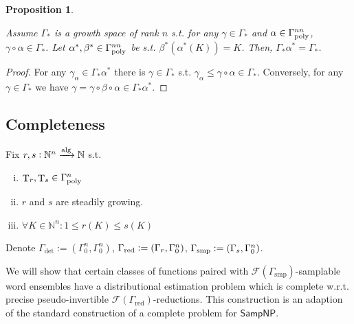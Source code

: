 \documentclass{article}
\numberwithin{equation}{section}
\theoremstyle{definition}
\theoremstyle{plain}
\newtheorem{proposition}{Proposition}[section]
\DeclareMathOperator{\T}{T}
\newcommand{\Nats}{\mathbb{N}}
\newcommand{\Fall}{\mathcal{F}}
\newcommand{\GammaPoly}{\Gamma_{\textnormal{poly}}}
\newcommand{\Alg}{\xrightarrow{\textnormal{alg}}}
\begin{document}
\begin{samepage}
\begin{proposition}
\label{prp:stable_growth_space}

Assume ${\Gamma_*}$ is a growth space of rank ${n}$ s.t. for any ${\gamma \in \Gamma_*}$ and ${\alpha \in \GammaPoly^{nn}}$, ${\gamma \circ \alpha \in \Gamma_*}$. Let ${\alpha^*, \beta^* \in \GammaPoly^{nn}}$ be s.t. ${\beta^*(\alpha^*(K))=K}$. Then, ${\Gamma_* \alpha^* = \Gamma_*}$.

\end{proposition}
\end{samepage}

\begin{proof}

For any ${\gamma_\alpha \in \Gamma_* \alpha^*}$ there is ${\gamma \in \Gamma_*}$ s.t. ${\gamma_\alpha \leq \gamma \circ \alpha \in \Gamma_*}$. Conversely, for any ${\gamma \in \Gamma_*}$ we have ${\gamma = \gamma \circ \beta \circ \alpha \in \Gamma_* \alpha^*}$.
%
\end{proof}

\subsection{Completeness}


Fix ${r,s: \Nats^n \Alg \Nats}$ s.t.

\begin{enumerate}[(i)]

\item ${\T_r, \T_s \in \GammaPoly^n}$

\item ${r}$ and ${s}$ are steadily growing.

\item ${\forall K \in \Nats^n: 1 \leq r(K) \leq s(K)}$

\end{enumerate}

Denote ${\Gamma_\text{det}:=(\Gamma_0^n,\Gamma_0^n)}$, ${\Gamma_{\textnormal{red}}:=(\Gamma_{r},\Gamma_0^n)}$, ${\Gamma_{\textnormal{smp}}:=(\Gamma_{s},\Gamma_0^n)}$.

We will show that certain classes of functions paired with ${\Fall(\Gamma_{\text{smp}})}$-samplable word ensembles have a distributional estimation problem which is complete w.r.t. precise pseudo-invertible ${\Fall(\Gamma_{\text{red}})}$-reductions. This construction is an adaption of the standard construction of a complete problem for ${\mathsf{SampNP}}$.
\end{document}
